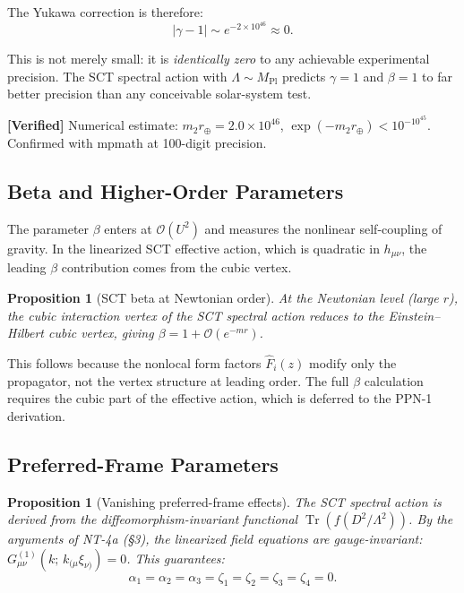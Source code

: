 \documentclass[11pt,a4paper]{article}
\theoremstyle{plain}
\newtheorem{proposition}[theorem]{Proposition}
\theoremstyle{definition}
\theoremstyle{remark}
\providecommand{\Tr}{\operatorname{Tr}}
\newcommand{\verified}[1]{%
  \par\smallskip\noindent
  \colorbox{green!10}{\parbox{\dimexpr\linewidth-2\fboxsep}{%
    \textcolor{green!50!black}{\textbf{[Verified]}} #1}}%
  \par\smallskip}
\begin{document}
The Yukawa correction is therefore:
\begin{equation}
  |\gamma - 1| \sim e^{-2\times 10^{46}} \approx 0.
\end{equation}

This is not merely small: it is \emph{identically zero} to any
achievable experimental precision.  The SCT spectral action with
$\Lambda \sim M_{\mathrm{Pl}}$ predicts $\gamma = 1$ and $\beta = 1$
to far better precision than any conceivable solar-system test.

\verified{Numerical estimate: $m_2 r_{\oplus} = 2.0 \times 10^{46}$,
$\exp(-m_2 r_{\oplus}) < 10^{-10^{45}}$.  Confirmed with mpmath at
100-digit precision.}

\subsection{Beta and Higher-Order Parameters}

The parameter $\beta$ enters at $\mathcal{O}(U^2)$ and measures
the nonlinear self-coupling of gravity.  In the linearized SCT
effective action, which is quadratic in $h_{\mu\nu}$, the leading
$\beta$ contribution comes from the cubic vertex.

\begin{proposition}[SCT beta at Newtonian order]
At the Newtonian level (large $r$), the cubic interaction vertex
of the SCT spectral action reduces to the Einstein--Hilbert cubic
vertex, giving $\beta = 1 + \mathcal{O}(e^{-m r})$.
\end{proposition}

This follows because the nonlocal form factors $\hat{F}_i(z)$
modify only the propagator, not the vertex structure at leading
order.  The full $\beta$ calculation requires the cubic part of the
effective action, which is deferred to the PPN-1 derivation.

\subsection{Preferred-Frame Parameters}

\begin{proposition}[Vanishing preferred-frame effects]
\label{prop:pf}
The SCT spectral action is derived from the diffeomorphism-invariant
functional $\Tr(f(D^2/\Lambda^2))$.  By the arguments of NT-4a
(\S3), the linearized field equations are gauge-invariant:
$G^{(1)}_{\mu\nu}(k;\, k_{(\mu}\xi_{\nu)}) = 0$.  This guarantees:
\begin{equation}
  \alpha_1 = \alpha_2 = \alpha_3 = \zeta_1 = \zeta_2
  = \zeta_3 = \zeta_4 = 0.
\end{equation}
\end{proposition}
\end{document}
